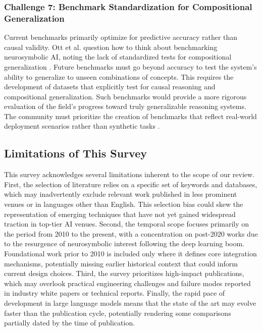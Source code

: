 \documentclass{article}
\begin{document}
\subsubsection{Challenge 7: Benchmark Standardization for Compositional Generalization}

\label{sec:challenge_7_benchmark_standardization_fo}

Current benchmarks primarily optimize for predictive accuracy rather than causal validity. Ott et al. question how to think about benchmarking neurosymbolic AI, noting the lack of standardized tests for compositional generalization \cite{ott2023think}. Future benchmarks must go beyond accuracy to test the system's ability to generalize to unseen combinations of concepts. This requires the development of datasets that explicitly test for causal reasoning and compositional generalization. Such benchmarks would provide a more rigorous evaluation of the field's progress toward truly generalizable reasoning systems. The community must prioritize the creation of benchmarks that reflect real-world deployment scenarios rather than synthetic tasks \cite{srivastava2022beyond}.

\subsection{Limitations of This Survey}

\label{sec:limitations_of_this_survey}

This survey acknowledges several limitations inherent to the scope of our review. First, the selection of literature relies on a specific set of keywords and databases, which may inadvertently exclude relevant work published in less prominent venues or in languages other than English. This selection bias could skew the representation of emerging techniques that have not yet gained widespread traction in top-tier AI venues. Second, the temporal scope focuses primarily on the period from 2010 to the present, with a concentration on post-2020 works due to the resurgence of neurosymbolic interest following the deep learning boom. Foundational work prior to 2010 is included only where it defines core integration mechanisms, potentially missing earlier historical context that could inform current design choices. Third, the survey prioritizes high-impact publications, which may overlook practical engineering challenges and failure modes reported in industry white papers or technical reports. Finally, the rapid pace of development in large language models means that the state of the art may evolve faster than the publication cycle, potentially rendering some comparisons partially dated by the time of publication.
\end{document}

